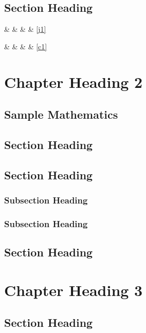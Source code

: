 \documentclass[dissertation,math,vertlayout,pdfa,colorlinks,nologo]{aaltoseries}
\begin{document}
\section{Section Heading}
\lipsum[11-12]


 \&  \&  \& \pageref{j1} \& \ref{j1}

 \&  \&   \& \pageref{c1} \& \ref{c1} 


\chapter{Chapter Heading 2}
\section{Sample Mathematics}



\section{Section Heading}
\lipsum[1-4]
\section{Section Heading}
\lipsum[5-6]
\subsection{Subsection Heading}
\lipsum[7-8]
\subsection{Subsection Heading}
\lipsum[9-10]
\section{Section Heading}
\lipsum[11-12]

\chapter[Short Chapter Heading]{Chapter Heading 3}
\section{Section Heading}
\lipsum[1-4]
\end{document}
